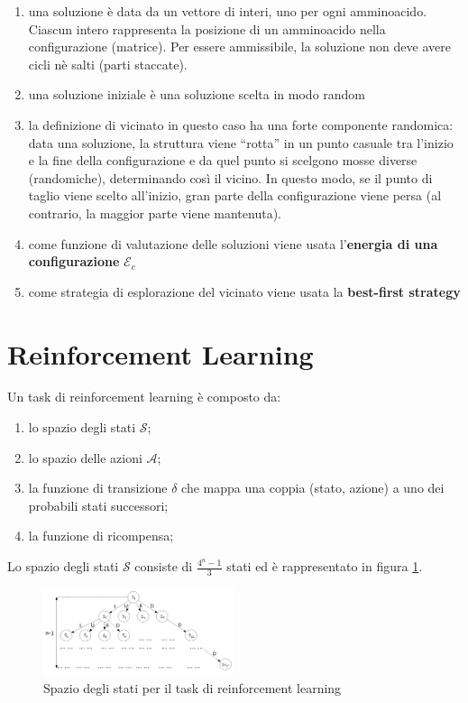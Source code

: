\documentclass[conference]{IEEEtran}
\begin{document}
\begin{enumerate}
 \item una soluzione è data da un vettore di interi, uno per ogni amminoacido. Ciascun intero rappresenta la posizione di un amminoacido nella configurazione (matrice). Per essere ammissibile, la soluzione non deve avere cicli nè salti (parti staccate).
 \item una soluzione iniziale è una soluzione scelta in modo random
 \item la definizione di vicinato in questo caso ha una forte componente randomica: data una soluzione, la struttura viene ``rotta'' in un punto casuale tra l'inizio e la fine della configurazione e da quel punto si scelgono mosse diverse (randomiche), determinando così il vicino. In questo modo, se il punto di taglio viene scelto all'inizio, gran parte della configurazione viene persa (al contrario, la maggior parte viene mantenuta).
 \item come funzione di valutazione delle soluzioni viene usata l'\textbf{energia di una configurazione} $\mathcal{E}_c$
 \item come strategia di esplorazione del vicinato viene usata la \textbf{best-first strategy}
\end{enumerate}

\section{Reinforcement Learning}

Un task di reinforcement learning è composto da:

\begin{enumerate}
 \item lo spazio degli stati $\mathcal{S}$;
 \item lo spazio delle azioni $\mathcal{A}$;
 \item la funzione di transizione $\delta$ che mappa una coppia (stato, azione) a uno dei probabili stati successori;
 \item la funzione di ricompensa;
\end{enumerate}

Lo spazio degli stati $\mathcal{S}$ consiste di $\frac{4^n - 1}{3}$ stati ed è rappresentato in figura \ref{fig:stateSpace}.

\begin{figure}[h]
\centering
\includegraphics[width=0.5\textwidth]{figure/stateSpace.png}
\caption{Spazio degli stati per il task di reinforcement learning}
\label{fig:stateSpace}
\end{figure}
\end{document}
